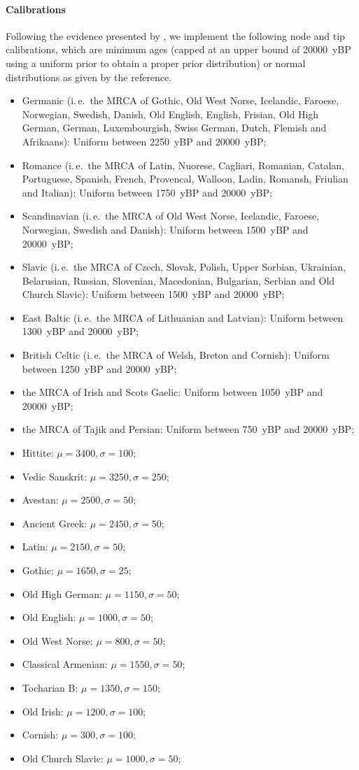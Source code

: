 \documentclass[]{rsos}%
\begin{document}
\paragraph{Calibrations}
Following the evidence presented by \textcite[Tables 7 and 12]{chang2015ancestryconstrained}, we implement the following node and tip calibrations, which are minimum ages (capped at an upper bound of 20000~yBP using a uniform prior to obtain a proper prior distribution) or normal distributions as given by the reference.
\begin{itemize}
  \item Germanic (i.\,e.\ the MRCA of Gothic, Old West Norse, Icelandic, Faroese, Norwegian, Swedish, Danish, Old English, English, Frisian, Old High German, German, Luxembourgish, Swiss German, Dutch, Flemish and Afrikaans): Uniform between 2250~yBP and 20000~yBP;
  \item Romance (i.\,e.\ the MRCA of Latin, Nuorese, Cagliari, Romanian, Catalan, Portuguese, Spanish, French, Provencal, Walloon, Ladin, Romansh, Friulian and Italian): Uniform between 1750~yBP and 20000~yBP;
  \item Scandinavian (i.\,e.\ the MRCA of Old West Norse, Icelandic, Faroese, Norwegian, Swedish and Danish): Uniform between 1500~yBP and 20000~yBP;
  \item Slavic (i.\,e.\ the MRCA of Czech, Slovak, Polish, Upper Sorbian, Ukrainian, Belarusian, Russian, Slovenian, Macedonian, Bulgarian, Serbian and Old Church Slavic): Uniform between 1500~yBP and 20000~yBP;
  \item East Baltic (i.\,e.\ the MRCA of Lithuanian and Latvian): Uniform between 1300~yBP and 20000~yBP;
  \item British Celtic (i.\,e.\ the MRCA of Welsh, Breton and Cornish): Uniform between 1250~yBP and 20000~yBP;
  \item the MRCA of Irish and Scots Gaelic: Uniform between 1050~yBP and 20000~yBP;
  \item the MRCA of Tajik and Persian: Uniform between 750~yBP and 20000~yBP;
  \item Hittite: $\mu=3400, \sigma=100$;
  \item Vedic Sanskrit: $\mu=3250, \sigma=250$;
  \item Avestan: $\mu=2500, \sigma=50$;
  \item Ancient Greek: $\mu=2450, \sigma=50$;
  \item Latin: $\mu=2150, \sigma=50$;
  \item Gothic: $\mu=1650, \sigma=25$;
  \item Old High German: $\mu=1150, \sigma=50$;
  \item Old English: $\mu=1000, \sigma=50$;
  \item Old West Norse: $\mu=800, \sigma=50$;
  \item Classical Armenian: $\mu=1550, \sigma=50$;
  \item Tocharian B: $\mu=1350, \sigma=150$;
  \item Old Irish: $\mu=1200, \sigma=100$;
  \item Cornish: $\mu=300, \sigma=100$;
  \item Old Church Slavic: $\mu=1000, \sigma=50$;
\end{itemize}
\end{document}
